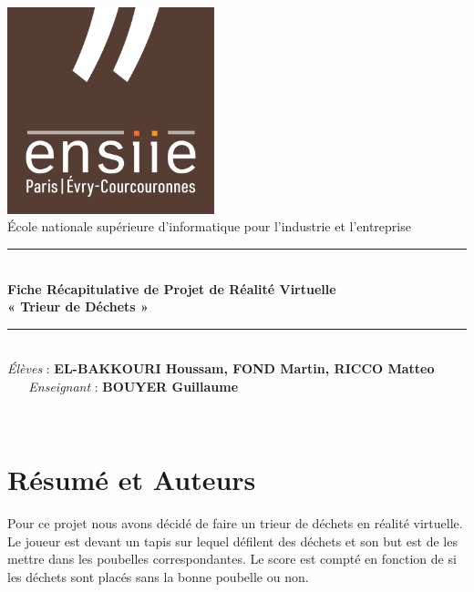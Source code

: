 \documentclass[a4paper,french,12pt]{article}
\newcommand{\HRule}{\rule{\linewidth}{0.5mm}}
\begin{document}
\begin{center}
\thispagestyle{empty} 

\includegraphics[height=6cm]{logo_ensiie.png}~\\[1.2cm]

{\large École nationale supérieure d'informatique pour l'industrie et l'entreprise\\[1.0cm]}

\HRule \\[0.5cm]

{\huge \bfseries Fiche Récapitulative de Projet de Réalité Virtuelle  \\[0.6cm]}
{\Large \bfseries « Trieur de Déchets »\\[0.5cm] }

\HRule \\[1.0cm]

{\large
\emph{Élèves} : \textbf{EL-BAKKOURI Houssam, FOND Martin, RICCO Matteo}\\
~
~
\emph{Enseignant} : \textbf{BOUYER Guillaume}\\
}%

~

\vfill


\vspace*{1.0cm}{Projet de Réalité Virtuelle 2022-2023}

\end{center}


\newpage
\thispagestyle{empty} 
\tableofcontents
\newpage

\section{Résumé et Auteurs}

Pour ce projet nous avons décidé de faire un trieur de déchets en réalité virtuelle.
Le joueur est devant un tapis sur lequel défilent des déchets et son but est de les mettre dans les poubelles correspondantes. Le score est compté en fonction de si les déchets sont placés sans la bonne poubelle ou non. 
\end{document}
